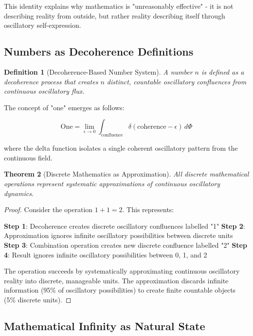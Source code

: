 \documentclass[11pt]{article}
\newtheorem{theorem}{Theorem}[section]
\newtheorem{definition}[theorem]{Definition}
\theoremstyle{remark}
\begin{document}
This identity explains why mathematics is "unreasonably effective" - it is not describing reality from outside, but rather reality describing itself through oscillatory self-expression.

\subsection{Numbers as Decoherence Definitions}

\begin{definition}[Decoherence-Based Number System]
A number $n$ is defined as a decoherence process that creates $n$ distinct, countable oscillatory confluences from continuous oscillatory flux.
\end{definition}

The concept of "one" emerges as follows:

$$\text{One} = \lim_{\epsilon \to 0} \int_{\text{confluence}} \delta(\text{coherence} - \epsilon) \, d\Phi$$

where the delta function isolates a single coherent oscillatory pattern from the continuous field.

\begin{theorem}[Discrete Mathematics as Approximation]
All discrete mathematical operations represent systematic approximations of continuous oscillatory dynamics.
\end{theorem}

\begin{proof}
Consider the operation $1 + 1 = 2$. This represents:

\textbf{Step 1}: Decoherence creates discrete oscillatory confluences labelled "1"
\textbf{Step 2}: Approximation ignores infinite oscillatory possibilities between discrete units
\textbf{Step 3}: Combination operation creates new discrete confluence labelled "2"
\textbf{Step 4}: Result ignores infinite oscillatory possibilities between 0, 1, and 2

The operation succeeds by systematically approximating continuous oscillatory reality into discrete, manageable units. The approximation discards infinite information (95\% of oscillatory possibilities) to create finite countable objects (5\% discrete units).
\end{proof}

\subsection{Mathematical Infinity as Natural State}
\end{document}
